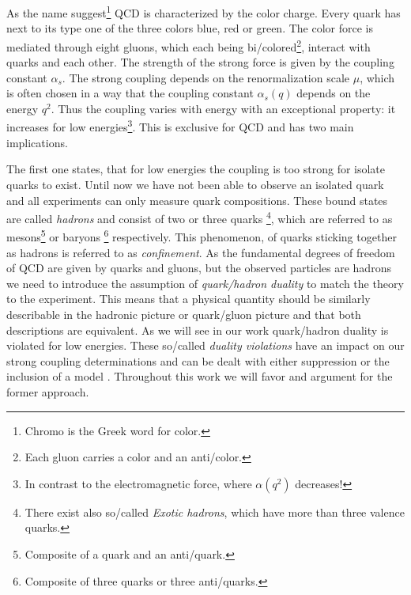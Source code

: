 \documentclass[../../index.tex]{subfiles}
\begin{document}
As the name suggest\footnote{Chromo is the Greek word for color.} QCD
is characterized by the color charge. Every quark has next to its type one
of the three colors blue, red or green. The color force is mediated through
eight gluons, which each being bi\-/colored\footnote{Each gluon carries a color
  and an anti\-/color.}, interact with quarks and each other. The strength of the
strong force is given by the coupling constant $\alpha_s$. The strong coupling
depends on the renormalization scale $\mu$, which is often chosen in a way that
the coupling constant $\alpha_s(q)$ depends on the energy $q^2$. Thus the
coupling varies with energy with an exceptional property: it increases for
low energies\footnote{In contrast to the electromagnetic force, where $\alpha(q^2)$
  decreases!}. This is exclusive for QCD and has two main implications.

The first one states, that for low energies the coupling is too strong for
isolate quarks to exist. Until now we have not been able to observe an isolated
quark and all experiments can only measure quark compositions. These bound
states are called \textit{hadrons} and consist of two or three quarks
\footnote{There exist also so\-/called \textit{Exotic hadrons}, which have more
  than three valence quarks.}, which are referred to as mesons\footnote{Composite
  of a quark and an anti\-/quark.} or baryons \footnote{Composite of three quarks
  or three anti\-/quarks.} respectively. This
phenomenon, of quarks sticking together as hadrons is referred to as \textit{confinement}. 
As the fundamental degrees of freedom of QCD are given by quarks and gluons, but
the observed particles are hadrons we need to introduce the assumption of
\textit{quark\-/hadron duality} to match the theory to the experiment. This means that a physical quantity should be
similarly describable in the hadronic picture or quark\-/gluon picture and that
both descriptions are equivalent. As we will see in our work quark\-/hadron
duality is violated for low energies. These so\-/called \textit{duality
  violations} have an impact on our strong coupling determinations and can be
dealt with either suppression or the inclusion of a model
\cite{Pich2006,Cata2008}.
Throughout this work we will favor and argument for the former approach.
\end{document}
